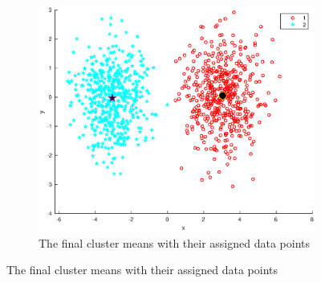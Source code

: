 \documentclass[10pt]{article}
\begin{document}
\begin{figure}[H]
\begin{subfigure}[b]{.45\textwidth}
    \includegraphics[width=\columnwidth]{Fig2_k2.eps}
    \caption{The final cluster means with their assigned data points}
    \label{fig1b}
  \end{subfigure}
  \label{fig1.1}
\end{figure}
\end{document}
